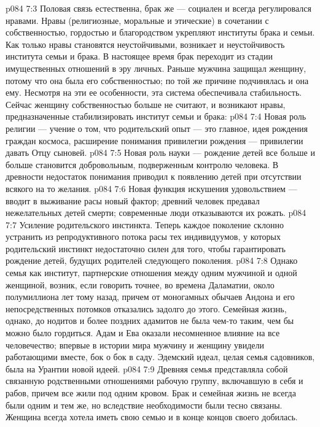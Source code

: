 \vs p084 7:3 Половая связь естественна, брак же --- социален и всегда регулировался нравами. Нравы (религиозные, моральные и этические) в сочетании с собственностью, гордостью и благородством укрепляют институты брака и семьи. Как только нравы становятся неустойчивыми, возникает и неустойчивость института семьи и брака. В настоящее время брак переходит из стадии имущественных отношений в эру личных. Раньше мужчина защищал женщину, потому что она была его собственностью; по той же причине подчинялась и она ему. Несмотря на эти ее особенности, эта система обеспечивала стабильность. Сейчас женщину собственностью больше не считают, и возникают нравы, предназначенные стабилизировать институт семьи и брака:
\vs p084 7:4 \bibnobreakspace Новая роль религии --- учение о том, что родительский опыт --- это главное, идея рождения граждан космоса, расширение понимания привилегии рождения --- привилегии давать Отцу сыновей.
\vs p084 7:5 \pc {}\bibnobreakspace Новая роль науки --- рождение детей все больше и больше становится добровольным, подверженным контролю человека. В древности недостаток понимания приводил к появлению детей при отсутствии всякого на то желания.
\vs p084 7:6 \pc {}\bibnobreakspace Новая функция искушения удовольствием --- вводит в выживание расы новый фактор; древний человек предавал нежелательных детей смерти; современные люди отказываются их рожать.
\vs p084 7:7 \pc {}\bibnobreakspace Усиление родительского инстинкта. Теперь каждое поколение склонно устранить из репродуктивного потока расы тех индивидуумов, у которых родительский инстинкт недостаточно силен для того, чтобы гарантировать рождение детей, будущих родителей следующего поколения.
\vs p084 7:8 \pc Однако семья как институт, партнерские отношения между одним мужчиной и одной женщиной, возник, если говорить точнее, во времена Даламатии, около полумиллиона лет тому назад, причем от моногамных обычаев Андона и его непосредственных потомков отказались задолго до этого. Семейная жизнь, однако, до нодитов и более поздних адамитов не была чем\hyp{}то таким, чем бы можно было гордиться. Адам и Ева оказали несомненное влияние на все человечество; впервые в истории мира мужчину и женщину увидели работающими вместе, бок о бок в саду. Эдемский идеал, целая семья садовников, была на Урантии новой идеей.
\vs p084 7:9 Древняя семья представляла собой связанную родственными отношениями рабочую группу, включавшую в себя и рабов, причем все жили под одним кровом. Брак и семейная жизнь не всегда были одним и тем же, но вследствие необходимости были тесно связаны. Женщина всегда хотела иметь свою семью и в конце концов своего добилась.
